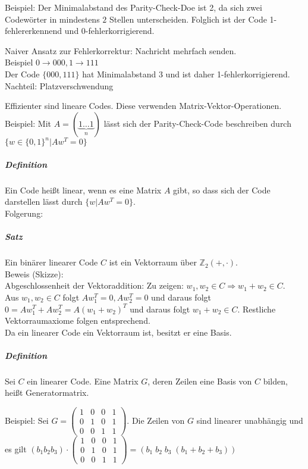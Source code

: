 \documentclass[a4paper]{scrartcl}
\begin{document}
Beispiel: Der Minimalabstand des Parity-Check-Doe ist 2, da sich zwei Codewörter in mindestens $2$ Stellen unterscheiden. Folglich ist der Code 1-fehlererkennend und 0-fehlerkorrigierend.

Naiver Ansatz zur Fehlerkorrektur: Nachricht mehrfach senden.\\
Beispiel $0\rightarrow 000, 1 \rightarrow 111$\\
Der Code $\{000,111\}$ hat Minimalabstand 3 und ist daher 1-fehlerkorrigierend.\\
Nachteil: Platzverschwendung

Effizienter sind lineare Codes. Diese verwenden Matrix-Vektor-Operationen.\\
Beispiel: Mit $A=(\underbrace{1\dots 1}_{n})$ lässt sich der Parity-Check-Code beschreiben durch $\{ w \in \{0,1\}^n |Aw^T = 0\}$

\subparagraph{Definition} Ein Code heißt linear, wenn es eine Matrix $A$ gibt, so dass sich der Code darstellen lässt durch $\{ w | Aw^T = 0 \}$.\\
Folgerung:

\subparagraph{Satz} Ein binärer linearer Code $C$ ist ein Vektorraum über $\mathbb{Z}_2 (+,\cdot)$.\\
Beweis (Skizze):\\
Abgeschlossenheit der Vektoraddition: Zu zeigen: $w_1,w_2 \in C \Rightarrow w_1 + w_2 \in C$.\\
Aus $w_1,w_2 \in C$ folgt $A w_1^T = 0, A w_2^T = 0$ und daraus folgt $0= Aw_1^T + Aw_2^T =A(w_1 + w_2)^T$ und daraus folgt $w_1 + w_2 \in C$. Restliche Vektorraumaxiome folgen entsprechend.\\
Da ein linearer Code ein Vektorraum ist, besitzt er eine Basis.

\subparagraph{Definition} Sei $C$ ein linearer Code. Eine Matrix $G$, deren Zeilen eine Basis von $C$ bilden, heißt Generatormatrix.

Beispiel: Sei $G= \begin{pmatrix} 1 & 0 & 0 & 1 \\ 0 & 1 & 0 & 1\\ 0 & 0 & 1 & 1 \end{pmatrix}$. Die Zeilen von $G$ sind linearer unabhängig und es gilt $(b_1 b_2 b_3 ) \cdot  \begin{pmatrix} 1 & 0 & 0 & 1 \\ 0 & 1 & 0 & 1\\ 0 & 0 & 1 & 1 \end{pmatrix} = (b_1 \; b_2 \; b_3 \; (b_1 + b_2 + b_3) )$
\end{document}

